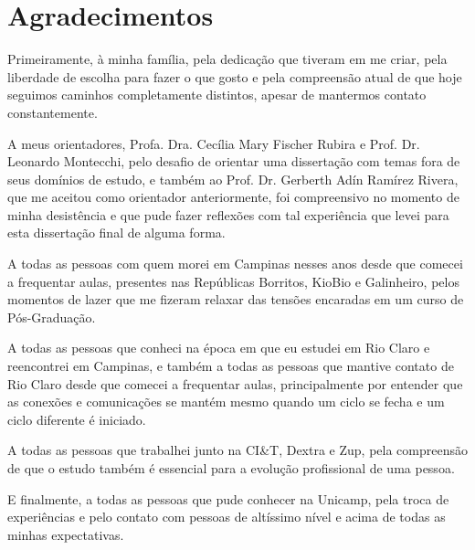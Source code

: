 \documentclass[portugues]{ic-tese}
\begin{document}
\chapter{Agradecimentos}
Primeiramente, à minha família, pela dedicação que tiveram em me criar, pela liberdade de escolha para fazer o que gosto e pela compreensão atual de que hoje seguimos caminhos completamente distintos, apesar de mantermos contato constantemente.

A meus orientadores, Profa. Dra. Cecília Mary Fischer Rubira e Prof. Dr. Leonardo Montecchi, pelo desafio de orientar uma dissertação com temas fora de seus domínios de estudo, e também ao Prof. Dr. Gerberth Adín Ramírez Rivera, que me aceitou como orientador anteriormente, foi compreensivo no momento de minha desistência e que pude fazer reflexões com tal experiência que levei para esta dissertação final de alguma forma.

A todas as pessoas com quem morei em Campinas nesses anos desde que comecei a frequentar aulas, presentes nas Repúblicas Borritos, KioBio e Galinheiro, pelos momentos de lazer que me fizeram relaxar das tensões encaradas em um curso de Pós-Graduação.

A todas as pessoas que conheci na época em que eu estudei em Rio Claro e reencontrei em Campinas, e também a todas as pessoas que mantive contato de Rio Claro desde que comecei a frequentar aulas, principalmente por entender que as conexões e comunicações se mantém mesmo quando um ciclo se fecha e um ciclo diferente é iniciado.

A todas as pessoas que trabalhei junto na CI\&T, Dextra e Zup, pela compreensão de que o estudo também é essencial para a evolução profissional de uma pessoa.

E finalmente, a todas as pessoas que pude conhecer na Unicamp, pela troca de experiências e pelo contato com pessoas de altíssimo nível e acima de todas as minhas expectativas.
\end{document}
